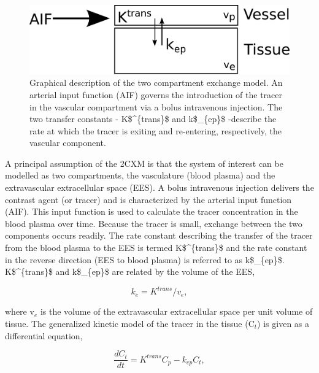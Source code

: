 \begin{figure}[htbp]
   \centering
   \includegraphics[width=\textwidth]{intro/intro-images/2CXM.pdf}
   \caption[Two compartment exchange model]{Graphical description of the two compartment exchange model. 
An arterial input function (\acs{AIF}) governs the introduction of the tracer in the vascular compartment via a bolus intravenous injection. 
The two transfer constants - \acs{K$^{trans}$} and \acs{k$_{ep}$} -describe the rate at which the tracer is exiting and re-entering, respectively, the vascular component.}
   \label{2CXM}
\end{figure}

A principal assumption of the 2CXM is that the system of interest can be modelled as two compartments, the vasculature (blood plasma) and the extravascular extracellular space (EES). 
A bolus intravenous injection delivers the contrast agent (or tracer) and is characterized by the arterial input function (\acs{AIF}). 
This input function is used to calculate the tracer concentration in the blood plasma over time. 
Because the tracer is small, exchange between the two components occurs readily. 
The rate constant describing the transfer of the tracer from the blood plasma to the EES is termed \acs{K$^{trans}$} and the rate constant in the reverse direction (EES to blood plasma) is referred to as \acs{k$_{ep}$}. 
\acs{K$^{trans}$} and \acs{k$_{ep}$} are related by the volume of the EES,

\begin{equation}
k_{e} = K^{trans} / v_{e},
\label{ke}
\end{equation}

where v$_{e}$ is the volume of the extravascular extracellular space per unit volume of tissue. 
The generalized kinetic model of the tracer in the tissue (C$_t$) is given as a differential equation,

\begin{equation}
\frac{dC_t}{dt} = K^{trans}C_p - k_{ep}C_t,
\label{2CXMeq}
\end{equation}

